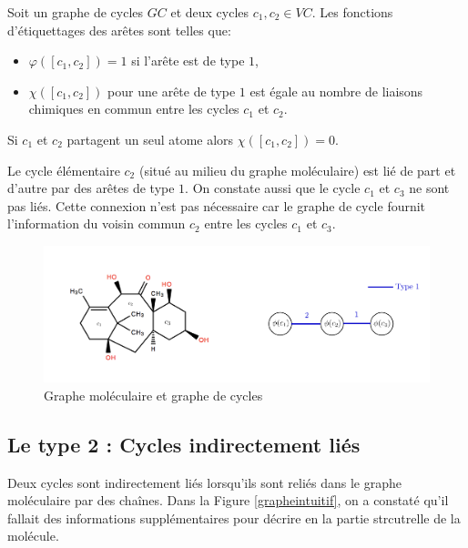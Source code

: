 Soit un graphe de cycles $GC$ et deux cycles $c_1, c_2 \in VC$. Les fonctions d'étiquettages des arêtes sont telles que:

\begin{itemize}
\item $\varphi([c_1,c_2]) = 1 $ si l'arête est de type $1$,
\item $\chi([c_1,c_2]) $ pour une arête de type $1$ est égale au nombre de liaisons chimiques en commun entre les cycles $c_1$ et $c_2$.
\end{itemize} 

Si $c_1$ et $c_2$ partagent un seul atome alors  $\chi([c_1,c_2]) = 0$.

\begin{exemple} Le cycle élémentaire $c_2$ (situé au milieu du graphe moléculaire) est lié de part et d'autre par des arêtes de type $1$. On constate aussi que le cycle $c_1$ et $c_3$ ne sont pas liés. Cette connexion n'est pas nécessaire car le graphe de cycle fournit l'information du voisin commun $c_2$ entre les cycles $c_1$ et $c_3$.

\begin{figure}[H]
\label{type1}

\begin{center}
\includegraphics[scale=0.85]{type1_exemple.png}
\end{center}
\caption{Graphe moléculaire et graphe de cycles }
\end{figure}

\end{exemple}

\subsection{Le type 2 : Cycles indirectement liés}

Deux cycles sont indirectement liés lorsqu'ils sont reliés dans le graphe moléculaire par des chaînes. Dans la Figure \ref{grapheintuitif}, on a constaté qu'il fallait des informations supplémentaires pour décrire en la partie strcutrelle de la molécule.



